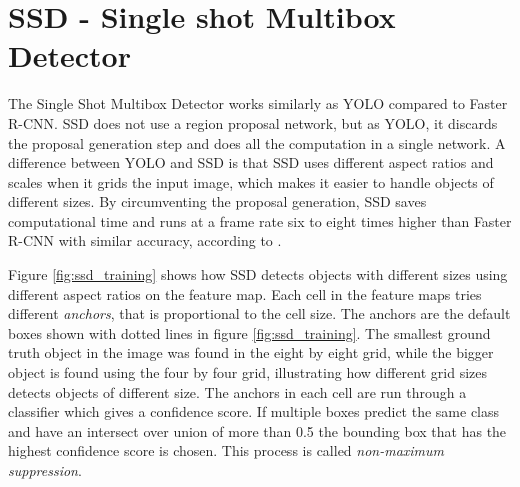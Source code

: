 

\newpage

\section{SSD - Single shot Multibox Detector}
The Single Shot Multibox Detector works similarly as YOLO compared to Faster R-CNN. SSD does not use a region proposal network, but as YOLO, it discards the proposal generation step and does all the computation in a single network. A difference between YOLO and SSD is that SSD uses different aspect ratios and scales when it grids the input image, which makes it easier to handle objects of different sizes. By circumventing the proposal generation, SSD saves computational time and runs at a frame rate six to eight times higher than Faster R-CNN with similar accuracy, according to \citep{SSD}. 



Figure \ref{fig:ssd_training} shows how SSD detects objects with different sizes using different aspect ratios on the feature map. Each cell in the feature maps tries different \textit{anchors}, that is proportional to the cell size. The anchors are the default boxes shown with dotted lines in figure \ref{fig:ssd_training}. The smallest ground truth object in the image was found in the eight by eight grid, while the bigger object is found using the four by four grid, illustrating how different grid sizes detects objects of different size. The anchors in each cell are run through a classifier which gives a confidence score. If multiple boxes predict the same class and have an intersect over union of more than 0.5 the bounding box that has the highest confidence score is chosen. This process is called \textit{non-maximum suppression}.

